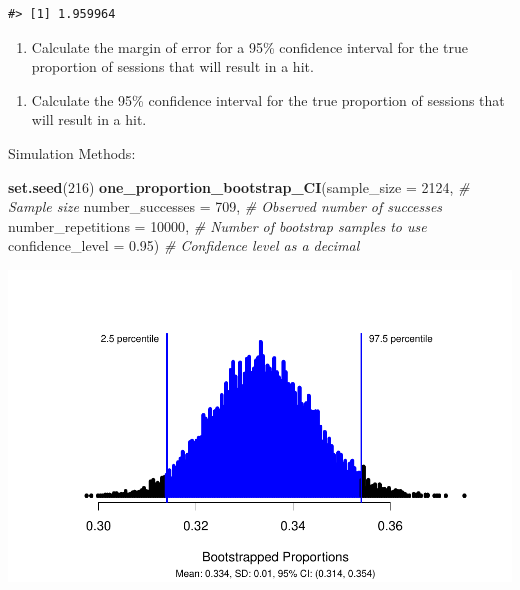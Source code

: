 \documentclass[
]{report}
\newenvironment{Shaded}{\begin{snugshade}}{\end{snugshade}}
\newcommand{\AttributeTok}[1]{\textcolor[rgb]{0.13,0.29,0.53}{#1}}
\newcommand{\CommentTok}[1]{\textcolor[rgb]{0.56,0.35,0.01}{\textit{#1}}}
\newcommand{\DecValTok}[1]{\textcolor[rgb]{0.00,0.00,0.81}{#1}}
\newcommand{\FloatTok}[1]{\textcolor[rgb]{0.00,0.00,0.81}{#1}}
\newcommand{\FunctionTok}[1]{\textcolor[rgb]{0.13,0.29,0.53}{\textbf{#1}}}
\newcommand{\NormalTok}[1]{#1}
\providecommand{\tightlist}{%
  \setlength{\itemsep}{0pt}\setlength{\parskip}{0pt}}
\begin{document}
\begin{verbatim}
#> [1] 1.959964
\end{verbatim}

\begin{enumerate}
\def\labelenumi{\arabic{enumi}.}
\setcounter{enumi}{11}
\tightlist
\item
  Calculate the margin of error for a 95\% confidence interval for the true proportion of sessions that will result in a hit.
\end{enumerate}

\vspace{0.6in}

\begin{enumerate}
\def\labelenumi{\arabic{enumi}.}
\setcounter{enumi}{12}
\tightlist
\item
  Calculate the 95\% confidence interval for the true proportion of sessions that will result in a hit.
\end{enumerate}

\vspace{1in}

Simulation Methods:

\begin{Shaded}
\begin{Highlighting}[]
\FunctionTok{set.seed}\NormalTok{(}\DecValTok{216}\NormalTok{)}
\FunctionTok{one\_proportion\_bootstrap\_CI}\NormalTok{(}\AttributeTok{sample\_size =} \DecValTok{2124}\NormalTok{, }\CommentTok{\# Sample size}
                    \AttributeTok{number\_successes =} \DecValTok{709}\NormalTok{, }\CommentTok{\# Observed number of successes}
                    \AttributeTok{number\_repetitions =} \DecValTok{10000}\NormalTok{, }\CommentTok{\# Number of bootstrap samples to use}
                    \AttributeTok{confidence\_level =} \FloatTok{0.95}\NormalTok{) }\CommentTok{\# Confidence level as a decimal}
\end{Highlighting}
\end{Shaded}

\begin{center}\includegraphics[width=0.8\linewidth]{05-UR-module4_review_files/figure-latex/unnamed-chunk-4-1} \end{center}
\end{document}

